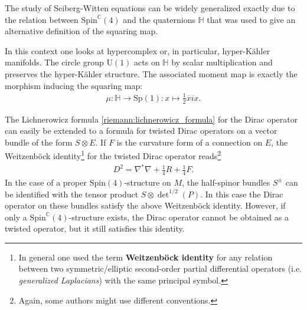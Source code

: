     \begin{remark}
        The study of Seiberg-Witten equations can be widely generalized exactly due to the relation between $\mathrm{Spin}^\mathbb{C}(4)$ and the quaternions $\mathbb{H}$ that was used to give an alternative definition of the squaring map.

        In this context one looks at hypercomplex or, in particular, hyper-K\"ahler manifolds. The circle group $\mathrm{U}(1)$ acts on $\mathbb{H}$ by scalar multiplication and preserves the hyper-K\"ahler structure. The associated moment map is exactly the morphism inducing the squaring map:
        \begin{gather}
            \mu:\mathbb{H}\rightarrow\mathrm{Sp}(1):x\mapsto\frac{1}{2}\overline{x}ix.
        \end{gather}
    \end{remark}

    \begin{property}
        The Lichnerowicz formula \ref{riemann:lichnerowicz_formula} for the Dirac operator can easily be extended to a formula for twisted Dirac operators on a vector bundle of the form $S\otimes E$. If $F$ is the curvature form of a connection on $E$, the Weitzenb\"ock identity\footnote{In general one used the term \textbf{Weitzenb\"ock identity} for any relation between two symmetric/elliptic second-order partial differential operators (i.e. \textit{generalized Laplacians}) with the same principal symbol.} for the twisted Dirac operator reads\footnote{Again, some authors might use different conventions.}
        \begin{gather}
            D^2 = \nabla^*\nabla+\frac{1}{4}R+\frac{1}{4}F.
        \end{gather}
        In the case of a proper $\mathrm{Spin}(4)$-structure on $M$, the half-spinor bundles $S^\pm$ can be identified with the tensor product $S\otimes\det^{1/2}(P)$. In this case the Dirac operator on these bundles satisfy the above Weitzenb\"ock identity. However, if only a $\mathrm{Spin}^\mathbb{C}(4)$-structure exists, the Dirac operator cannot be obtained as a twisted operator, but it still satisfies this identity.
    \end{property}


